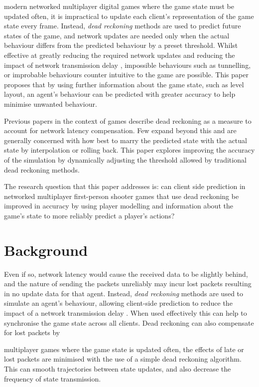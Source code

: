 \documentclass[journal]{IEEEtran}
\begin{document}
 modern networked multiplayer digital games where the game state must be updated often, it is impractical to update each client's representation of the game state every frame. Instead, \textit{dead reckoning} methods are used to predict future states of the game, and network updates are needed only when the actual behaviour differs from the predicted behaviour by a preset threshold. Whilst effective at greatly reducing the required network updates and reducing the impact of network transmission delay \cite{pantel2002suitability}, impossible behaviours such as tunnelling, or improbable behaviours counter intuitive to the game are possible. This paper proposes that by using further information about the game state, such as level layout, an agent's behaviour can be predicted with greater accuracy to help minimise unwanted behaviour.

Previous papers in the context of games describe dead reckoning as a measure to account for network latency compensation. Few expand beyond this and are generally concerned with how best to marry the predicted state with the actual state by interpolation or rolling back. This paper explores improving the accuracy of the simulation by dynamically adjusting the threshold allowed by traditional dead reckoning methods.

The research question that this paper addresses is: can client side prediction in networked multiplayer first-person shooter games that use dead reckoning be improved in accuracy by using player modelling and information about the game's state to more reliably predict a player's actions?


\section{Background}

Even if so, network latency would cause the received data to be slightly behind, and the nature of sending the packets unreliably \cite{cronin2001distributed} may incur lost packets resulting in no update data for that agent. Instead, \textit{dead reckoning} methods are used to simulate an agent's behaviour, allowing client-side prediction to reduce the impact of a network transmission delay \cite{pantel2002suitability}. When used effectively this can help to synchronise the game state across all clients. Dead reckoning can also compensate for lost packets by 



multiplayer games where the game state is updated often, the effects of late or lost packets are minimised with the use of a simple dead reckoning algorithm. This can smooth trajectories between state updates, and also decrease the frequency of state transmission.
\end{document}
